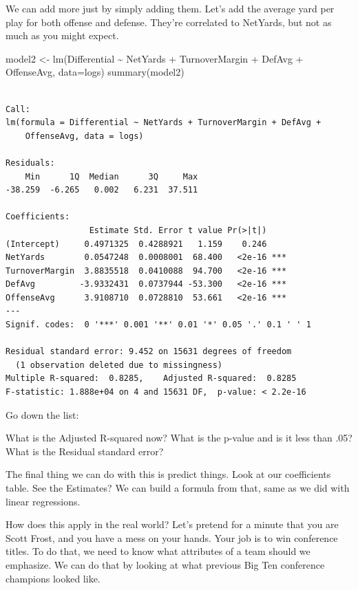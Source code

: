 \documentclass[
  letterpaper,
  DIV=11,
  numbers=noendperiod]{scrreprt}
\newenvironment{Shaded}{\begin{snugshade}}{\end{snugshade}}
\newcommand{\AttributeTok}[1]{\textcolor[rgb]{0.40,0.45,0.13}{#1}}
\newcommand{\FunctionTok}[1]{\textcolor[rgb]{0.28,0.35,0.67}{#1}}
\newcommand{\NormalTok}[1]{\textcolor[rgb]{0.00,0.23,0.31}{#1}}
\newcommand{\OtherTok}[1]{\textcolor[rgb]{0.00,0.23,0.31}{#1}}
\newcommand{\SpecialCharTok}[1]{\textcolor[rgb]{0.37,0.37,0.37}{#1}}
\begin{document}
We can add more just by simply adding them. Let's add the average yard
per play for both offense and defense. They're correlated to NetYards,
but not as much as you might expect.

\begin{Shaded}
\begin{Highlighting}[]
\NormalTok{model2 }\OtherTok{\textless{}{-}} \FunctionTok{lm}\NormalTok{(Differential }\SpecialCharTok{\textasciitilde{}}\NormalTok{ NetYards }\SpecialCharTok{+}\NormalTok{ TurnoverMargin }\SpecialCharTok{+}\NormalTok{ DefAvg }\SpecialCharTok{+}\NormalTok{ OffenseAvg, }\AttributeTok{data=}\NormalTok{logs)}
\FunctionTok{summary}\NormalTok{(model2)}
\end{Highlighting}
\end{Shaded}

\begin{verbatim}

Call:
lm(formula = Differential ~ NetYards + TurnoverMargin + DefAvg + 
    OffenseAvg, data = logs)

Residuals:
    Min      1Q  Median      3Q     Max 
-38.259  -6.265   0.002   6.231  37.511 

Coefficients:
                 Estimate Std. Error t value Pr(>|t|)    
(Intercept)     0.4971325  0.4288921   1.159    0.246    
NetYards        0.0547248  0.0008001  68.400   <2e-16 ***
TurnoverMargin  3.8835518  0.0410088  94.700   <2e-16 ***
DefAvg         -3.9332431  0.0737944 -53.300   <2e-16 ***
OffenseAvg      3.9108710  0.0728810  53.661   <2e-16 ***
---
Signif. codes:  0 '***' 0.001 '**' 0.01 '*' 0.05 '.' 0.1 ' ' 1

Residual standard error: 9.452 on 15631 degrees of freedom
  (1 observation deleted due to missingness)
Multiple R-squared:  0.8285,    Adjusted R-squared:  0.8285 
F-statistic: 1.888e+04 on 4 and 15631 DF,  p-value: < 2.2e-16
\end{verbatim}

Go down the list:

What is the Adjusted R-squared now? What is the p-value and is it less
than .05? What is the Residual standard error?

The final thing we can do with this is predict things. Look at our
coefficients table. See the Estimates? We can build a formula from that,
same as we did with linear regressions.

How does this apply in the real world? Let's pretend for a minute that
you are Scott Frost, and you have a mess on your hands. Your job is to
win conference titles. To do that, we need to know what attributes of a
team should we emphasize. We can do that by looking at what previous Big
Ten conference champions looked like.
\end{document}
